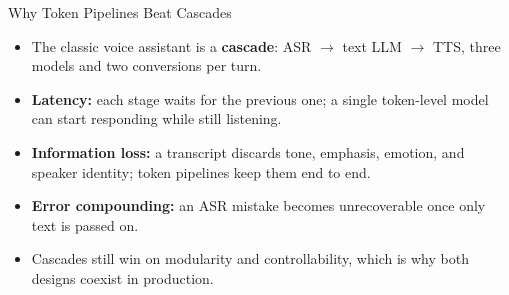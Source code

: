 \begin{frame}{Why Token Pipelines Beat Cascades}
  \begin{itemize}
    \item The classic voice assistant is a \textbf{cascade}: ASR $\rightarrow$ text LLM $\rightarrow$ TTS, three models and two conversions per turn.
    \item \textbf{Latency:} each stage waits for the previous one; a single token-level model can start responding while still listening.
    \item \textbf{Information loss:} a transcript discards tone, emphasis, emotion, and speaker identity; token pipelines keep them end to end.
    \item \textbf{Error compounding:} an ASR mistake becomes unrecoverable once only text is passed on.
    \item Cascades still win on modularity and controllability, which is why both designs coexist in production.
  \end{itemize}
\end{frame}
